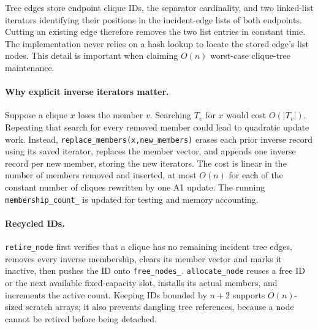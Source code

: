 Tree edges store endpoint clique IDs, the separator cardinality, and two linked-list iterators identifying their positions in the incident-edge lists of both endpoints.  Cutting an existing edge therefore removes the two list entries in constant time.  The implementation never relies on a hash lookup to locate the stored edge's list nodes.  This detail is important when claiming \(O(n)\) worst-case clique-tree maintenance.

\paragraph{Why explicit inverse iterators matter.} Suppose a clique \(x\) loses the member \(v\).  Searching \(T_v\) for \(x\) would cost \(O(|T_v|)\).  Repeating that search for every removed member could lead to quadratic update work.  Instead, \texttt{replace\_members(x,new\_members)} erases each prior inverse record using its saved iterator, replaces the member vector, and appends one inverse record per new member, storing the new iterators.  The cost is linear in the number of members removed and inserted, at most \(O(n)\) for each of the constant number of cliques rewritten by one A1 update.  The running \texttt{membership\_count\_} is updated for testing and memory accounting.

\paragraph{Recycled IDs.} \texttt{retire\_node} first verifies that a clique has no remaining incident tree edges, removes every inverse membership, clears its member vector and marks it inactive, then pushes the ID onto \texttt{free\_nodes\_}.  \texttt{allocate\_node} reuses a free ID or the next available fixed-capacity slot, installs its actual members, and increments the active count.  Keeping IDs bounded by \(n+2\) supports \(O(n)\)-sized scratch arrays; it also prevents dangling tree references, because a node cannot be retired before being detached.

